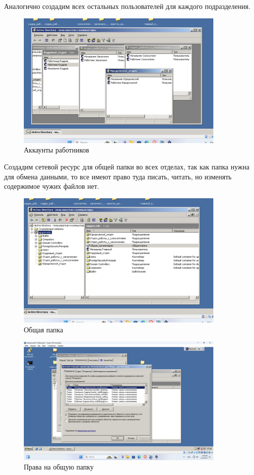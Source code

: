 Аналогично создадим всех остальных пользователей для каждого подразделения.

\begin{figure}[H]
  \centering
  \includegraphics[width=0.9\textwidth]{pict/prac/4}
  \caption{Аккаунты работников}
  \label{fig:15}
\end{figure}

Создадим сетевой ресурс для общей папки во всех отделах, так как папка нужна для обмена данными, то 
все имеют право туда писать, читать, но изменять содержимое чужих файлов нет.

\begin{figure}[H]
  \centering
  \includegraphics[width=0.9\textwidth]{pict/prac/5}
  \caption{Общая папка}
  \label{fig:16}
\end{figure}

\begin{figure}[H]
  \centering
  \includegraphics[width=0.9\textwidth]{pict/prac/6}
  \caption{Права на общую папку}
  \label{fig:17}
\end{figure}


